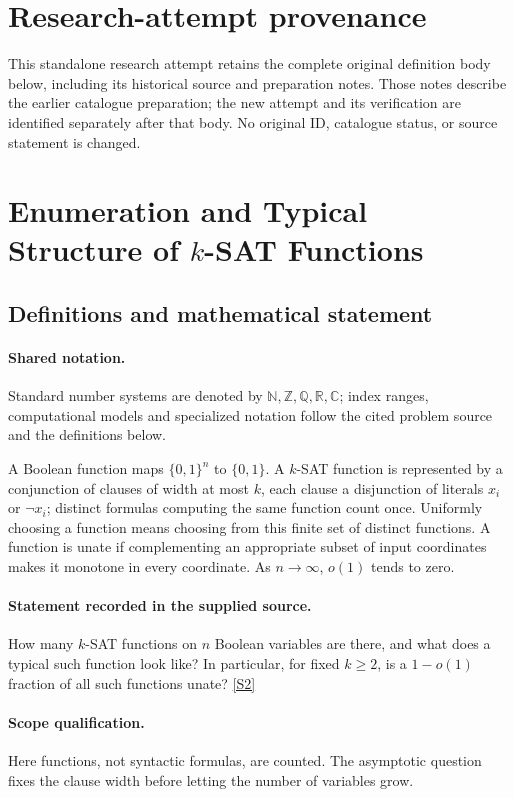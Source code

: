 \documentclass[11pt]{article}
\begin{document}
\section*{Research-attempt provenance}
This standalone research attempt retains the complete original definition body below,
including its historical source and preparation notes. Those notes describe the
earlier catalogue preparation; the new attempt and its verification are identified
separately after that body. No original ID, catalogue status, or source statement is changed.

\section{Enumeration and Typical Structure of $k$-SAT Functions}\label{statement}

\subsection{Definitions and mathematical statement}

\paragraph{Shared notation.}Standard number systems are denoted by $\mathbb N,\mathbb Z,\mathbb Q,\mathbb R,\mathbb C$; index ranges, computational models and specialized notation follow the cited problem source and the definitions below.


A Boolean function maps $\{0,1\}^n$ to $\{0,1\}$. A $k$-SAT function is represented by a conjunction of clauses of width at most $k$, each clause a disjunction of literals $x_i$ or $\neg x_i$; distinct formulas computing the same function count once. Uniformly choosing a function means choosing from this finite set of distinct functions. A function is unate if complementing an appropriate subset of input coordinates makes it monotone in every coordinate. As $n\to\infty$, $o(1)$ tends to zero.
\paragraph{Statement recorded in the supplied source.}
How many $k$-SAT functions on $n$ Boolean variables are there, and what does a typical such function look like? In particular, for fixed $k\geq 2$, is a $1-o(1)$ fraction of all such functions unate? \href{https://doi.org/10.4171/owr/2022/22}{[S2]}
\paragraph{Scope qualification.}
Here functions, not syntactic formulas, are counted. The asymptotic question fixes the clause width before letting the number of variables grow.
\end{document}
